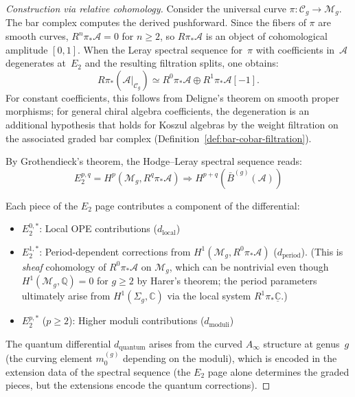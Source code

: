 \begin{proof}[Construction via relative cohomology]
Consider the universal curve $\pi: \mathcal{C}_g \to \mathcal{M}_g$. The bar complex computes the derived pushforward.
Since the fibers of $\pi$ are smooth curves, $R^n\pi_*\mathcal{A} = 0$ for $n \geq 2$, so $R\pi_*\mathcal{A}$ is an object of cohomological amplitude $[0,1]$.  When the Leray spectral sequence for~$\pi$ with coefficients in~$\mathcal{A}$ degenerates at~$E_2$ and the resulting filtration splits, one obtains:
\[R\pi_* \left(\mathcal{A}|_{\mathcal{C}_g}\right) \simeq R^0\pi_* \mathcal{A} \oplus R^1\pi_* \mathcal{A}[-1].\]  For constant coefficients, this follows from Deligne's theorem on smooth proper morphisms; for general chiral algebra coefficients, the degeneration is an additional hypothesis that holds for Koszul algebras by the weight filtration on the associated graded bar complex (Definition~\ref{def:bar-cobar-filtration}).

By Grothendieck's theorem, the Hodge--Leray spectral sequence reads:
\[E_2^{p,q} = H^p(\mathcal{M}_g, R^q\pi_*\mathcal{A}) \Rightarrow H^{p+q}(\bar{B}^{(g)}(\mathcal{A}))\]

Each piece of the $E_2$ page contributes a component of the differential:
\begin{itemize}
\item $E_2^{0,*}$: Local OPE contributions ($d_{\text{local}}$)
\item $E_2^{1,*}$: Period-dependent corrections from $H^1(\mathcal{M}_g, R^0\pi_*\mathcal{A})$ ($d_{\text{period}}$).  (This is \emph{sheaf} cohomology of $R^0\pi_*\mathcal{A}$ on $\mathcal{M}_g$, which can be nontrivial even though $H^1(\mathcal{M}_g, \mathbb{Q}) = 0$ for $g \geq 2$ by Harer's theorem; the period parameters ultimately arise from $H^1(\Sigma_g, \mathbb{C})$ via the local system $R^1\pi_*\underline{\mathbb{C}}$.)
\item $E_2^{p,*}$ ($p \geq 2$): Higher moduli contributions ($d_{\text{moduli}}$)
\end{itemize}
The quantum differential $d_{\text{quantum}}$ arises from the curved $A_\infty$ structure at genus~$g$ (the curving element $m_0^{(g)}$ depending on the moduli), which is encoded in the extension data of the spectral sequence (the $E_2$ page alone determines the graded pieces, but the extensions encode the quantum corrections).


\end{proof}
